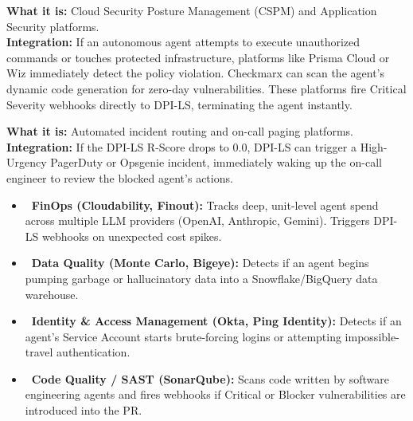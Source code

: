 \documentclass[11pt,a4paper]{article}
\begin{document}
\vspace{0.3cm}
\begin{tcolorbox}[enhanced, colback=dpiteal!5!white, colframe=dpiteal, title={\textbf{\faUserShield\ Security Posture \& AppSec (Prisma Cloud, Wiz, Checkmarx)}}, fonttitle=\bfseries, boxrule=1pt, arc=2mm]
\textbf{\color{dpiteal}What it is:} Cloud Security Posture Management (CSPM) and Application Security platforms. \\[0.2cm]
\textbf{\color{dpiteal}Integration:} If an autonomous agent attempts to execute unauthorized commands or touches protected infrastructure, platforms like Prisma Cloud or Wiz immediately detect the policy violation. Checkmarx can scan the agent's dynamic code generation for zero-day vulnerabilities. These platforms fire Critical Severity webhooks directly to DPI-LS, terminating the agent instantly.
\end{tcolorbox}

\vspace{0.3cm}
\begin{tcolorbox}[enhanced, colback=dpiblue!5!white, colframe=dpiblue, title={\textbf{\faPhoneVolume\ Incident Response \& Paging (PagerDuty, Opsgenie)}}, fonttitle=\bfseries, boxrule=1pt, arc=2mm]
\textbf{\color{dpiblue}What it is:} Automated incident routing and on-call paging platforms. \\[0.2cm]
\textbf{\color{dpiblue}Integration:} If the DPI-LS R-Score drops to 0.0, DPI-LS can trigger a High-Urgency PagerDuty or Opsgenie incident, immediately waking up the on-call engineer to review the blocked agent's actions.
\end{tcolorbox}

\vspace{0.3cm}
\begin{tcolorbox}[enhanced, colback=gray!5!white, colframe=gray, title={\textbf{\faLayerGroup\ Specialized Risk Platforms (FinOps, Data Quality, IAM, Code Quality)}}, fonttitle=\bfseries, boxrule=1pt, arc=2mm]
\begin{itemize}
\item \textbf{\color{dpicloud}\faMoneyBillWave\ FinOps (Cloudability, Finout):} Tracks deep, unit-level agent spend across multiple LLM providers (OpenAI, Anthropic, Gemini). Triggers DPI-LS webhooks on unexpected cost spikes.
    \item \textbf{\color{dpigreen}\faDatabase\ Data Quality (Monte Carlo, Bigeye):} Detects if an agent begins pumping garbage or hallucinatory data into a Snowflake/BigQuery data warehouse.
    \item \textbf{\color{dpiblue}\faIdCard\ Identity \& Access Management (Okta, Ping Identity):} Detects if an agent's Service Account starts brute-forcing logins or attempting impossible-travel authentication.
    \item \textbf{\color{dpired}\faCode\ Code Quality / SAST (SonarQube):} Scans code written by software engineering agents and fires webhooks if Critical or Blocker vulnerabilities are introduced into the PR.
\end{itemize}
\end{tcolorbox}
\end{document}
